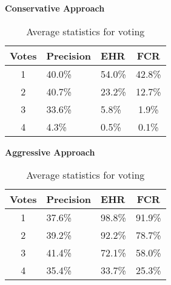 \begin{table}[h]
  \centering
  \textbf{Conservative Approach}\vspace{2pt}
  \begin{tabularx}{\columnwidth}{cXXc}
    \toprule
    \textbf{Votes} & \textbf{Precision} & \textbf{EHR} & \textbf{FCR} \\
    \midrule
    1 & 40.0\% & 54.0\% & 42.8\% \\ \hline
    2 & 40.7\% & 23.2\% & 12.7\% \\ \hline
    3 & 33.6\% & 5.8\% & 1.9\% \\ \hline
    4 & 4.3\% & 0.5\% & 0.1\% \\ \hline
    \bottomrule
  \end{tabularx}

  \vspace{4pt}

  \textbf{Aggressive Approach}\vspace{2pt}
  \begin{tabularx}{\columnwidth}{cXXc}
    \toprule
    \textbf{Votes} & \textbf{Precision} & \textbf{EHR} & \textbf{FCR} \\
    \midrule
    1 & 37.6\% & 98.8\% & 91.9\% \\ \hline
    2 & 39.2\% & 92.2\% & 78.7\% \\ \hline
    3 & 41.4\% & 72.1\% & 58.0\% \\ \hline
    4 & 35.4\% & 33.7\% & 25.3\% \\ \hline
    \bottomrule
  \end{tabularx}

  \caption{Average statistics for voting}
  \label{[TABLE] avg_stats_voting}
\end{table}